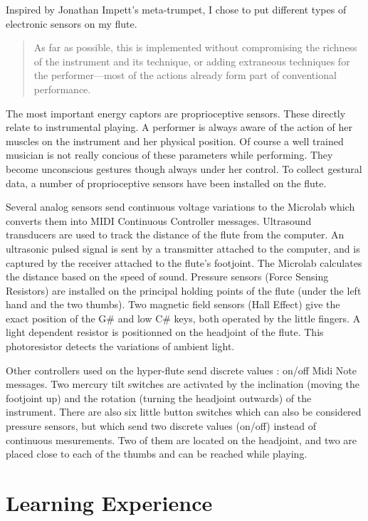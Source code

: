 Inspired by Jonathan Impett's meta-trumpet, I chose to put different types of electronic sensors on my flute. 

\begin{quotation}
As far as possible, this is implemented without compromising the richness of the instrument and its technique, or adding extraneous techniques for the performer---most of the actions already form part of conventional performance. \cite[p.148]{Impett:1994} 
\end{quotation}

The most important energy captors are proprioceptive sensors. These directly relate to instrumental playing. A performer is always aware of the action of her muscles on the instrument and her physical position. Of course a well trained musician is not really concious of these parameters while performing. They become unconscious gestures though always under her control. To collect gestural data, a number of proprioceptive sensors have been installed on the flute. 

Several analog sensors send continuous voltage variations to the Microlab which converts them into MIDI Continuous Controller messages.  Ultrasound transducers are used to track the distance of the flute from the computer.  An ultrasonic pulsed signal is sent by a transmitter attached to the computer, and is captured by the receiver attached to the flute's footjoint.  The Microlab calculates the distance based on the speed of sound.  Pressure sensors (Force Sensing Resistors) are installed on the principal holding points of the flute (under the left hand and the two thumbs). Two magnetic field sensors (Hall Effect) give the exact position of the G\# and low C\# keys, both operated by the little fingers. A light dependent resistor is positionned on the headjoint of the flute. This photoresistor detects the variations of ambient light. 

Other controllers used on the hyper-flute send discrete values : on/off Midi Note messages. Two mercury tilt switches are activated by the inclination (moving the footjoint up) and the rotation (turning the headjoint outwards) of the instrument. There are also six little button switches which can also be considered pressure sensors, but which send two discrete values (on/off) instead of continuous mesurements. Two of them are located on the headjoint, and two are placed close to each of the thumbs and can be reached while playing. 


\section{Learning Experience}

